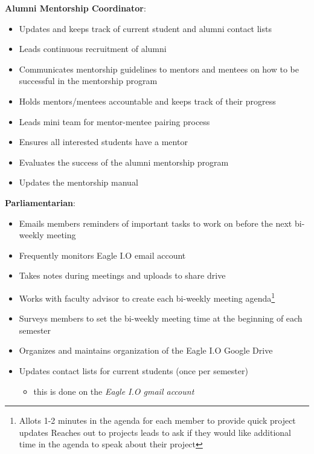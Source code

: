 \documentclass[
]{book}
\providecommand{\tightlist}{%
  \setlength{\itemsep}{0pt}\setlength{\parskip}{0pt}}
\begin{document}
\textbf{Alumni Mentorship Coordinator}:

\begin{itemize}
\tightlist
\item
  Updates and keeps track of current student and alumni contact lists\\
\item
  Leads continuous recruitment of alumni\\
\item
  Communicates mentorship guidelines to mentors and mentees on how to be successful in the mentorship program\\
\item
  Holds mentors/mentees accountable and keeps track of their progress\\
\item
  Leads mini team for mentor-mentee pairing process\\
\item
  Ensures all interested students have a mentor
\item
  Evaluates the success of the alumni mentorship program
\item
  Updates the mentorship manual
\end{itemize}

\textbf{Parliamentarian}:

\begin{itemize}
\tightlist
\item
  Emails members reminders of important tasks to work on before the next bi-weekly meeting
\item
  Frequently monitors Eagle I.O email account
\item
  Takes notes during meetings and uploads to share drive\\
\item
  Works with faculty advisor to create each bi-weekly meeting agenda\footnote{Allots 1-2 minutes in the agenda for each member to provide quick project updates Reaches out to projects leads to ask if they would like additional time in the agenda to speak about their project}
\item
  Surveys members to set the bi-weekly meeting time at the beginning of each semester
\item
  Organizes and maintains organization of the Eagle I.O Google Drive
\item
  Updates contact lists for current students (once per semester)

  \begin{itemize}
  \tightlist
  \item
    this is done on the \emph{Eagle I.O gmail account}
  \end{itemize}
\end{itemize}
\end{document}
